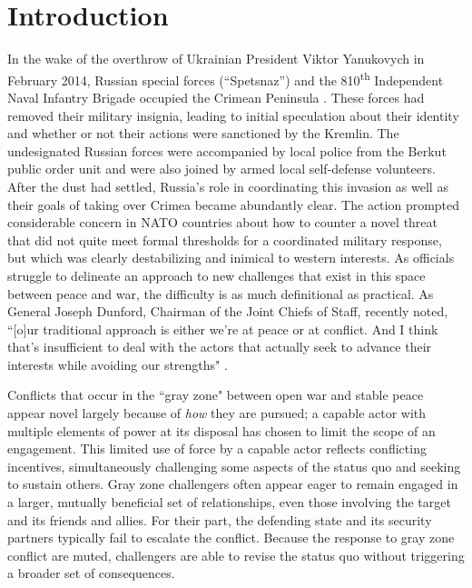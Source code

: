 \documentclass[12pt,letterpaper]{article}
\begin{document}
\section{Introduction}
	In the wake of the overthrow of Ukrainian President Viktor Yanukovych in February 2014,  Russian special forces (``Spetsnaz'') and the 810\textsuperscript{th} Independent Naval Infantry Brigade occupied the Crimean Peninsula \citep{kofman_lessonsrussiaoperations_2017}. These forces had removed their military insignia, leading to initial speculation about their identity and whether or not their actions were sanctioned by the Kremlin. The undesignated Russian forces were accompanied by local police from the Berkut public order unit and were also joined by armed local self-defense volunteers. After the dust had settled, Russia's role in coordinating this invasion as well as their goals of taking over Crimea became abundantly clear. The action prompted considerable concern in NATO countries about how to counter a novel threat that did not quite meet formal thresholds for a coordinated military response, but which was clearly destabilizing and inimical to western interests. As officials struggle to delineate an approach to new challenges that exist in this space between peace and war, the difficulty is as much definitional as practical. As General Joseph Dunford, Chairman of the Joint Chiefs of Staff, recently noted, ``[o]ur traditional approach is either we're at peace or at conflict. And I think that's insufficient to deal with the actors that actually seek to advance their interests while avoiding our strengths" \citep{dunford_gendunfordremarks_2016}.
	
	Conflicts that occur in the ``gray zone" between open war and stable peace appear novel largely because of \textit{how} they are pursued; a capable actor with multiple elements of power at its disposal has chosen to limit the scope of an engagement. This limited use of force by a capable actor reflects conflicting incentives, simultaneously challenging some aspects of the status quo and seeking to sustain others. Gray zone challengers often appear eager to remain engaged in a larger, mutually beneficial set of relationships, even those involving the target and its friends and allies. For their part, the defending state and its security partners typically fail to escalate the conflict. Because the response to gray zone conflict are muted, challengers are able to revise the status quo without triggering a broader set of consequences.
	
\end{document}
